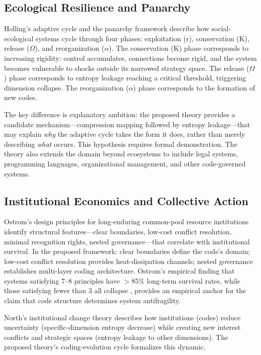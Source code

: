 \documentclass[11pt,a4paper]{article}
\begin{document}
\subsection{Ecological Resilience and Panarchy}

Holling's adaptive cycle \citep{holling1973} and the panarchy framework \citep{gunderson2002} describe how social-ecological systems cycle through four phases: exploitation (r), conservation (K), release ($\Omega$), and reorganization ($\alpha$). The conservation (K) phase corresponds to increasing rigidity: control accumulates, connections become rigid, and the system becomes vulnerable to shocks outside its narrowed strategy space. The release ($\Omega$) phase corresponds to entropy leakage reaching a critical threshold, triggering dimension collapse. The reorganization ($\alpha$) phase corresponds to the formation of new codes.

The key difference is explanatory ambition: the proposed theory provides a candidate mechanism---compression mapping followed by entropy leakage---that may explain \textit{why} the adaptive cycle takes the form it does, rather than merely describing \textit{what} occurs. This hypothesis requires formal demonstration. The theory also extends the domain beyond ecosystems to include legal systems, programming languages, organizational management, and other code-governed systems.

\subsection{Institutional Economics and Collective Action}

Ostrom's design principles for long-enduring common-pool resource institutions \citep{ostrom1990, ostrom2005} identify structural features---clear boundaries, low-cost conflict resolution, minimal recognition rights, nested governance---that correlate with institutional survival. In the proposed framework: clear boundaries define the code's domain; low-cost conflict resolution provides heat-dissipation channels; nested governance establishes multi-layer coding architecture. Ostrom's empirical finding that systems satisfying 7--8 principles have $>$85\% long-term survival rates, while those satisfying fewer than 3 all collapse \citep[ch. 3]{ostrom1990}, provides an empirical anchor for the claim that code structure determines system antifragility.

North's institutional change theory \citep{north1990} describes how institutions (codes) reduce uncertainty (specific-dimension entropy decrease) while creating new interest conflicts and strategic spaces (entropy leakage to other dimensions). The proposed theory's coding-evolution cycle formalizes this dynamic.
\end{document}
